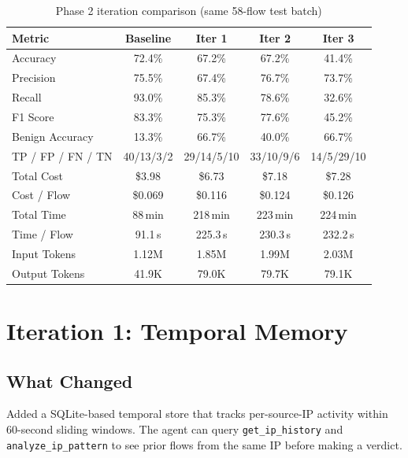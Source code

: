 \documentclass[12pt, a4paper, oneside]{report}
\begin{document}
\begin{table}[H]
\centering
\caption{Phase 2 iteration comparison (same 58-flow test batch)}
\label{tab:phase2-summary}
\begin{tabular}{@{}lcccc@{}}
\toprule
\textbf{Metric} & \textbf{Baseline} & \textbf{Iter 1} & \textbf{Iter 2} & \textbf{Iter 3} \\
\midrule
Accuracy          & 72.4\%  & 67.2\%  & 67.2\%  & 41.4\% \\
Precision         & 75.5\%  & 67.4\%  & 76.7\%  & 73.7\% \\
Recall            & 93.0\%  & 85.3\%  & 78.6\%  & 32.6\% \\
F1 Score          & 83.3\%  & 75.3\%  & 77.6\%  & 45.2\% \\
Benign Accuracy   & 13.3\%  & 66.7\%  & 40.0\%  & 66.7\% \\
\midrule
TP / FP / FN / TN & 40/13/3/2 & 29/14/5/10 & 33/10/9/6 & 14/5/29/10 \\
\midrule
Total Cost        & \$3.98  & \$6.73  & \$7.18  & \$7.28 \\
Cost / Flow       & \$0.069 & \$0.116 & \$0.124 & \$0.126 \\
Total Time        & 88\,min & 218\,min & 223\,min & 224\,min \\
Time / Flow       & 91.1\,s & 225.3\,s & 230.3\,s & 232.2\,s \\
Input Tokens      & 1.12M   & 1.85M   & 1.99M   & 2.03M \\
Output Tokens     & 41.9K   & 79.0K   & 79.7K   & 79.1K \\
\bottomrule
\end{tabular}
\end{table}


\section{Iteration 1: Temporal Memory}
\label{sec:iter1}

\subsection{What Changed}

Added a SQLite-based temporal store that tracks per-source-IP activity within
60-second sliding windows. The agent can query \texttt{get\_ip\_history} and
\texttt{analyze\_ip\_pattern} to see prior flows from the same IP before making
a verdict.
\end{document}
